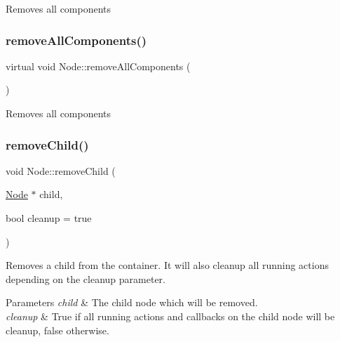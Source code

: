 Removes all components \mbox{\label{classNode_a4b776f7b64fc5d0fd32280eabf5c3a71}} 
\subsubsection{\texorpdfstring{remove\+All\+Components()}{removeAllComponents()}\hspace{0.1cm}{\footnotesize\ttfamily [2/2]}}
{\footnotesize\ttfamily virtual void Node\+::remove\+All\+Components (\begin{DoxyParamCaption}{ }\end{DoxyParamCaption})\hspace{0.3cm}{\ttfamily [virtual]}}

Removes all components \mbox{\label{classNode_a872d4a7d389b26b0c6ad7ed99c8b1b65}} 
\subsubsection{\texorpdfstring{remove\+Child()}{removeChild()}\hspace{0.1cm}{\footnotesize\ttfamily [1/2]}}
{\footnotesize\ttfamily void Node\+::remove\+Child (\begin{DoxyParamCaption}\item[{\hyperlink{classNode}{Node} $\ast$}]{child,  }\item[{bool}]{cleanup = {\ttfamily true} }\end{DoxyParamCaption})\hspace{0.3cm}{\ttfamily [virtual]}}

Removes a child from the container. It will also cleanup all running actions depending on the cleanup parameter.


\begin{DoxyParams}{Parameters}
{\em child} & The child node which will be removed. \\
\hline
{\em cleanup} & True if all running actions and callbacks on the child node will be cleanup, false otherwise. \\
\hline
\end{DoxyParams}


